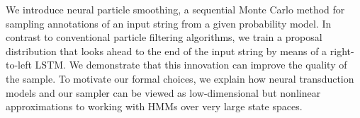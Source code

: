 We introduce neural particle smoothing, a sequential Monte Carlo method for sampling annotations of an input string from a given probability model.  In contrast to conventional particle filtering algorithms, we train a  proposal distribution that looks ahead to the end of the input string by means of a right-to-left LSTM.  We demonstrate that this innovation can improve the quality of the sample.                          To motivate our formal choices, we explain how neural transduction models and our sampler can be viewed as low-dimensional but nonlinear approximations to working with HMMs over very large state spaces.
